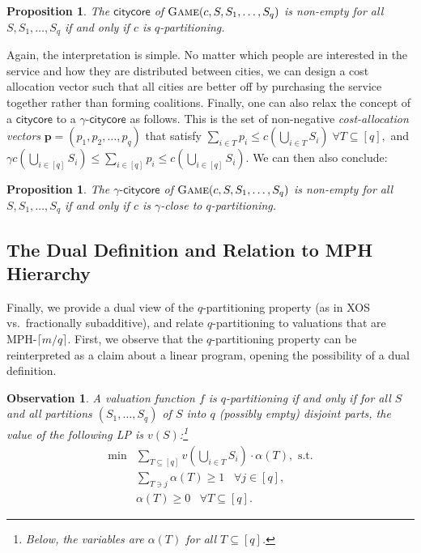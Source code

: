 \documentclass[11pt]{article}\usepackage{amsfonts}
\newtheorem{proposition}[theorem]{Proposition}
\newtheorem{observation}[theorem]{Observation}
\numberwithin{theorem}{subsection}
\newcommand{\game}{\textsc{Game}}
\newcommand{\citycore}{{\mathsf{citycore}}}
\newcommand{\gammacitycore}{\gamma\text{-}\mathsf{citycore}}
\begin{document}
\begin{proposition}
\label{prop:maincostsharing}
The $\citycore$ of $\game(c,S,S_1,\ldots, S_q)$
is non-empty for all $S,S_1,\ldots, S_q$
if and only if $c$ is $q$-partitioning.
\end{proposition}

Again, the interpretation is simple. No matter
which people are interested in the service and how they are distributed between cities, we can design a cost allocation vector such that all cities are better off by purchasing the service together rather than forming coalitions. Finally, one can also relax the concept of a $\citycore$ to a $\gammacitycore$ as follows. This is the set of non-negative \textit{cost-allocation vectors} $\mathbf{p} = (p_1, p_2, \ldots, p_q)$ that satisfy $\sum_{i\in T}p_i \le c(\bigcup_{i\in T}S_i) \; \forall T\subseteq [q],$ and 
$\gamma c(\bigcup_{i \in [q]}S_i)\le \sum_{i\in [q]}p_i \le c(\bigcup_{i \in [q]}S_i).$ We can then also conclude:

\begin{proposition}
\label{prop:gammacitycore}
The $\gammacitycore$ of $\game(c,S,S_1,\ldots, S_q)$
is non-empty for all $S,S_1,\ldots, S_q$
if and only if $c$ is $\gamma$-close to $q$-partitioning.
\end{proposition}

\subsection{The Dual Definition and Relation to MPH Hierarchy}\label{sec:dualqpart}
Finally, we provide a dual view of the $q$-partitioning property (as in XOS vs.~fractionally subadditive), and relate $q$-partitioning to valuations that are MPH-$\lceil m/q \rceil$. First, we observe that the $q$-partitioning property can be reinterpreted as a claim about a linear program, opening the possibility of a dual definition.

\begin{observation}\label{obs:primal} A valuation function $f$ is $q$-partitioning if and only if for all $S$ and all partitions $(S_1,\ldots, S_q)$ of $S$ into $q$ (possibly empty) disjoint parts, the value of the following LP is $v(S)$:\footnote{Below, the variables are $\alpha(T)$ for all $T \subseteq [q]$.}
\begin{equation}
\label{eq:qpartprimalLP}
    \begin{split}
        \min &\sum_{{T}\subseteq [q]}v(\bigcup_{i \in T}S_i)\cdot \alpha(T), \text{ s.t.}\\
        & \sum_{T \ni j} \alpha(T)\ge 1 \; \; \; \forall j\in [q],\\
        &\alpha(T)\ge 0 \; \; \; \forall T\subseteq [q].
    \end{split}
\end{equation}
\end{observation}
\end{document}
